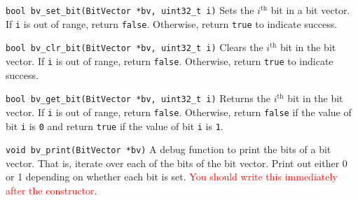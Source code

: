 \begin{funcdoc}{\texttt{bool bv\_set\_bit(BitVector *bv, uint32\_t i)}}
  Sets the $i^\text{th}$ bit in a bit vector. If \texttt{i} is out of
  range, return \texttt{false}. Otherwise, return \texttt{true} to
  indicate success.
\end{funcdoc}

\begin{funcdoc}{\texttt{bool bv\_clr\_bit(BitVector *bv, uint32\_t i)}}
  Clears the $i^\text{th}$ bit in the bit vector. If \texttt{i} is out
  of range, return \texttt{false}. Otherwise, return \texttt{true} to
  indicate success.
\end{funcdoc}

\begin{funcdoc}{\texttt{bool bv\_get\_bit(BitVector *bv, uint32\_t i)}}
  Returns the $i^\text{th}$ bit in the bit vector. If \texttt{i} is out
  of range, return \texttt{false}. Otherwise, return \texttt{false} if
  the value of bit \texttt{i} is \texttt{0} and return \texttt{true} if
  the value of bit \texttt{i} is \texttt{1}.
\end{funcdoc}

\begin{funcdoc}{\texttt{void bv\_print(BitVector *bv)}}
  A debug function to print the bits of a bit vector. That is, iterate
  over each of the bits of the bit vector. Print out either 0 or 1
  depending on whether each bit is set. \textcolor{red}{You should write
  this immediately after the constructor}.
\end{funcdoc}
